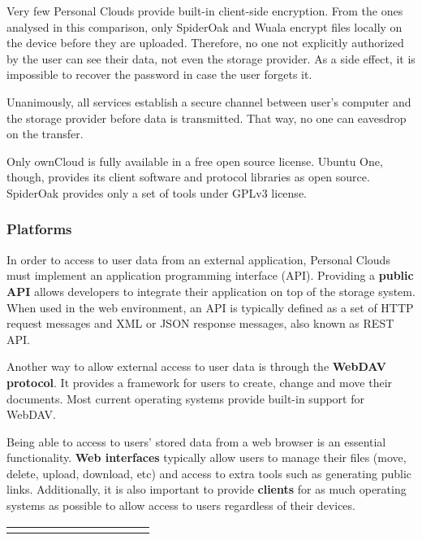 {Very few Personal Clouds provide built-in client-side encryption. From the ones analysed in this comparison, only SpiderOak and Wuala encrypt files locally on the device before they are uploaded. Therefore, no one not explicitly authorized by the user can see their data, not even the storage provider. As a side effect, it is impossible to recover the password in case the user forgets it.

Unanimously, all services establish a secure channel between user's computer and the storage provider before data is transmitted. That way, no one can eavesdrop on the transfer.

Only ownCloud is fully available in a free open source license. Ubuntu One, though, provides its client software and protocol libraries as open source. SpiderOak provides only a set of tools under GPLv3 license.



\subsubsection{Platforms}


In order to access to user data from an external application, Personal Clouds must implement an application programming interface (API). Providing a \textbf{public API} allows developers to integrate their application on top of the storage system. When used in the web environment, an API is typically defined as a set of HTTP request messages and XML or JSON response messages, also known as REST API.

Another way to allow external access to user data is through the \textbf{WebDAV protocol}. It provides a framework for users to create, change and move their documents. Most current operating systems provide built-in support for WebDAV.

Being able to access to users' stored data from a web browser is an essential functionality. \textbf{Web interfaces} typically allow users to manage their files (move, delete, upload, download, etc) and access to extra tools such as generating public links. Additionally, it is also important to provide \textbf{clients} for as much operating systems as possible to allow access to users regardless of their devices.


{
\def\arraystretch{1.5}

\begin{table}
\begin{center}
    \begin{tabular}{ | p{3.0cm} | p{0.9cm} | p{0.9cm} | p{0.9cm} | p{0.9cm} | p{0.9cm} | p{0.9cm} | p{0.9cm} | p{0.9cm} | p{0.9cm} | p{0.9cm} | }
    \hline
    \rowcolor[gray]{0.8}


\end{tabular}
\end{center}
\end{table}}}
